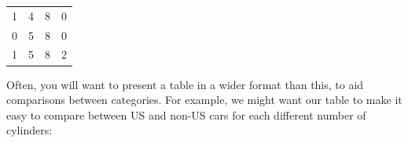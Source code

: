 \documentclass[]{article}
\newenvironment{Shaded}{\begin{snugshade}}{\end{snugshade}}
\newcommand{\KeywordTok}[1]{\textcolor[rgb]{0.13,0.29,0.53}{\textbf{#1}}}
\newcommand{\StringTok}[1]{\textcolor[rgb]{0.31,0.60,0.02}{#1}}
\newcommand{\OperatorTok}[1]{\textcolor[rgb]{0.81,0.36,0.00}{\textbf{#1}}}
\newcommand{\NormalTok}[1]{#1}
\theoremstyle{definition}
\theoremstyle{definition}
\theoremstyle{definition}
\theoremstyle{remark}
\begin{document}
\begin{longtable}[]{@{}cccc@{}}
\begin{minipage}[t]{0.06\columnwidth}
1\strut
\end{minipage} & \begin{minipage}[t]{0.09\columnwidth}\centering\strut
4\strut
\end{minipage} & \begin{minipage}[t]{0.07\columnwidth}\centering\strut
8\strut
\end{minipage} & \begin{minipage}[t]{0.07\columnwidth}\centering\strut
0\strut
\end{minipage}\tabularnewline
\begin{minipage}[t]{0.06\columnwidth}\centering\strut
0\strut
\end{minipage} & \begin{minipage}[t]{0.09\columnwidth}\centering\strut
5\strut
\end{minipage} & \begin{minipage}[t]{0.07\columnwidth}\centering\strut
8\strut
\end{minipage} & \begin{minipage}[t]{0.07\columnwidth}\centering\strut
0\strut
\end{minipage}\tabularnewline
\begin{minipage}[t]{0.06\columnwidth}\centering\strut
1\strut
\end{minipage} & \begin{minipage}[t]{0.09\columnwidth}\centering\strut
5\strut
\end{minipage} & \begin{minipage}[t]{0.07\columnwidth}\centering\strut
8\strut
\end{minipage} & \begin{minipage}[t]{0.07\columnwidth}\centering\strut
2\strut
\end{minipage}\tabularnewline
\bottomrule
\end{longtable}

Often, you will want to present a table in a wider format than this, to
aid comparisons between categories. For example, we might want our table
to make it easy to compare between US and non-US cars for each different
number of cylinders:

\begin{Shaded}
\end{Shaded}
\end{document}
